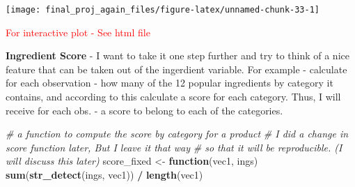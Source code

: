 \documentclass[
]{article}
\newenvironment{Shaded}{\begin{snugshade}}{\end{snugshade}}
\newcommand{\CommentTok}[1]{\textcolor[rgb]{0.56,0.35,0.01}{\textit{#1}}}
\newcommand{\ControlFlowTok}[1]{\textcolor[rgb]{0.13,0.29,0.53}{\textbf{#1}}}
\newcommand{\KeywordTok}[1]{\textcolor[rgb]{0.13,0.29,0.53}{\textbf{#1}}}
\newcommand{\NormalTok}[1]{#1}
\newcommand{\OperatorTok}[1]{\textcolor[rgb]{0.81,0.36,0.00}{\textbf{#1}}}
\newcommand{\StringTok}[1]{\textcolor[rgb]{0.31,0.60,0.02}{#1}}
\begin{document}
\begin{center}\texttt{[image: final\_proj\_again\_files/figure-latex/unnamed-chunk-33-1]} \end{center}

\textcolor{red}{For interactive plot - See html file}

\textbf{Ingredient Score} - I want to take it one step further and try
to think of a nice feature that can be taken out of the ingerdient
variable. For example - calculate for each observation - how many of the
12 popular ingredients by category it contains, and according to this
calculate a score for each category. Thus, I will receive for each obs.
- a score to belong to each of the categories.

\begin{Shaded}
\begin{Highlighting}[]
\CommentTok{# a function to compute the score by category for a product}
\CommentTok{# I did a change in score function later, But I leave it that way }
\CommentTok{# so that it will be reproducible. (I will discuss this later) }
\NormalTok{score_fixed <-}\StringTok{ }\ControlFlowTok{function}\NormalTok{(vec1, ings) }\KeywordTok{sum}\NormalTok{(}\KeywordTok{str_detect}\NormalTok{(ings, vec1)) }\OperatorTok{/}\StringTok{ }\KeywordTok{length}\NormalTok{(vec1)}


\end{Highlighting}
\end{Shaded}
\end{document}
